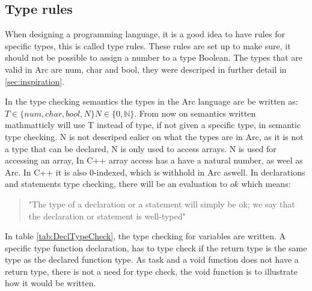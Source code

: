 \subsection{Type rules}\label{subsec:typerules}





When designing a programming language, it is a good idea to have rules for specific types, this is called type rules. These rules are set up to make sure, it should not be possible to assign a number to a type Boolean. 
The types that are valid in Arc are num, char and bool, they were descriped in further detail in \ref*{sec:inspiration}.

In the type checking semantics the types in the Arc language are be written as:
$T \in \{num, char, bool, N\} N \in \{ 0,\mathbb{N}\}$.
From now on semantics written mathmatticly will use T instead of type, if not given a specific type, in semantic type checking.
N is not descriped ealier on what the types are in Arc, as it is not a type that can be declared, N is only used to access arrays. N is used for accessing an array, In C++ array access has a have a natural number, as weel as Arc. In C++ it is also 0-indexed, which is withhold in Arc aswell.  
In declarations and statements type checking, there will be an evaluation to $ok$ which means: \begin{quote}
    "The type of a declaration or a statement will simply be ok; we say that
the declaration or statement is well-typed"\cite{Huttel2010}
\end{quote}

In table \ref*{tab:DeclTypeCheck}, the type checking for variables are written. A specific type function declaration, has to type check if the return type is the same type as the declared function type. As task and a void function does not have a return type, there is not a need for type check, the void function is to illustrate how it would be written.

